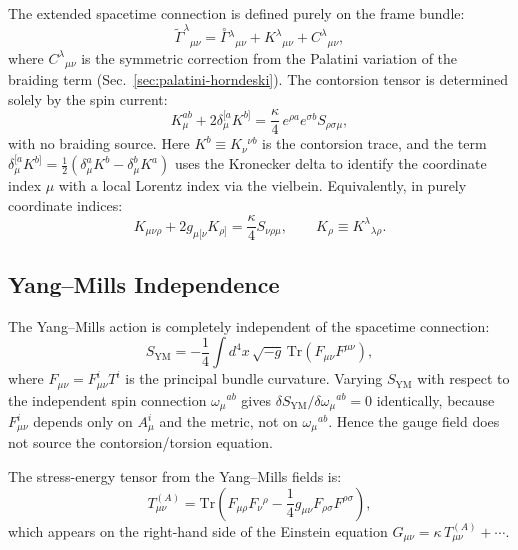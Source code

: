 \documentclass[twocolumn,prd,amsmath,amssymb]{revtex4-2}
\begin{document}
The extended spacetime connection is defined purely on the frame bundle:
\begin{equation}
\tilde{\Gamma}^{\lambda}{}_{\mu\nu} = \overset{\circ}{\Gamma}{}^{\lambda}{}_{\mu\nu}
+ K^{\lambda}{}_{\mu\nu} + C^{\lambda}{}_{\mu\nu},
\label{eq:full-connection}
\end{equation}
where $C^{\lambda}{}_{\mu\nu}$ is the symmetric correction from the Palatini variation
of the braiding term (Sec.~\ref{sec:palatini-horndeski}).
The contorsion tensor is determined solely by the spin current:
\begin{equation}
K_{\mu}^{ab} + 2\delta^{[a}_{\mu}K^{b]} = \frac{\kappa}{4}\,e^{\rho a}e^{\sigma b}S_{\rho\sigma\mu},
\label{eq:contorsion}
\end{equation}
with no braiding source.  Here $K^{b} \equiv K_{\nu}{}^{\nu b}$ is the contorsion trace,
and the term $\delta^{[a}_{\mu}K^{b]} = \tfrac12(\delta^{a}_{\mu}K^{b} - \delta^{b}_{\mu}K^{a})$
uses the Kronecker delta to identify the coordinate index $\mu$ with a local Lorentz index
via the vielbein.  Equivalently, in purely coordinate indices:
\begin{equation}
K_{\mu\nu\rho} + 2g_{\mu[\nu}K_{\rho]} = \frac{\kappa}{4}S_{\nu\rho\mu},
\qquad K_{\rho} \equiv K^{\lambda}{}_{\lambda\rho}.
\label{eq:contorsion-coord}
\end{equation}

\subsection{Yang--Mills Independence}

The Yang--Mills action is completely independent of the spacetime connection:
\begin{equation}
S_{\text{YM}} = -\frac{1}{4}\int d^4x\,\sqrt{-g}\,\mathrm{Tr}(F_{\mu\nu}F^{\mu\nu}),
\label{eq:ym-action}
\end{equation}
where $F_{\mu\nu} = F_{\mu\nu}^{i}T^{i}$ is the principal bundle curvature.  Varying
$S_{\text{YM}}$ with respect to the independent spin connection $\omega_{\mu}{}^{ab}$
gives $\delta S_{\text{YM}}/\delta\omega_{\mu}{}^{ab}=0$ identically, because
$F_{\mu\nu}^{i}$ depends only on $A_{\mu}^{i}$ and the metric, not on $\omega_{\mu}{}^{ab}$.
Hence the gauge field does not source the contorsion/torsion equation.

The stress-energy tensor from the Yang--Mills fields is:
\begin{equation}
T_{\mu\nu}^{(A)} = \mathrm{Tr}\left(F_{\mu\rho}F_{\nu}{}^{\rho}
- \frac14 g_{\mu\nu}F_{\rho\sigma}F^{\rho\sigma}\right),
\label{eq:ym-stress}
\end{equation}
which appears on the right-hand side of the Einstein equation
$G_{\mu\nu} = \kappa\,T_{\mu\nu}^{(A)} + \cdots$.
\end{document}
